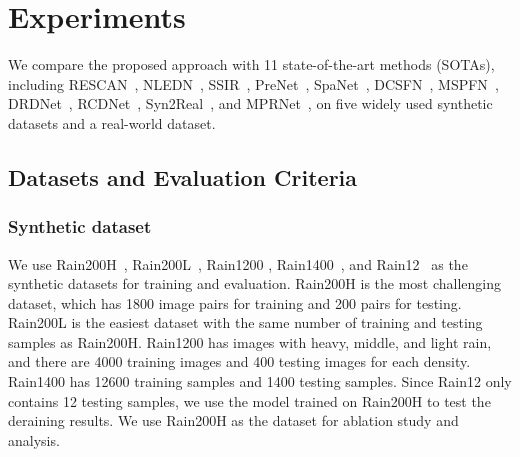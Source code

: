 \documentclass[letterpaper]{article} %
\begin{document}
%
\section{Experiments}
\label{sec: experiments}
%
We compare the proposed approach with 11 state-of-the-art methods (SOTAs), including
RESCAN~\cite{derain_rescan_li},
NLEDN~\cite{derain_nledn_li},
SSIR~\cite{Derain-cvpr19-semi},
PreNet~\cite{derain_prenet_Ren_2019_CVPR},
SpaNet~\cite{derain_2019_CVPR_spa},
DCSFN~\cite{mm20_wang_dcsfn},
MSPFN~\cite{cvpr20_jiang_mspfn},
DRDNet~\cite{drd_cvpr20_deng},
RCDNet~\cite{cvpr20_wang_rcdnet},
Syn2Real~\cite{cvpr20_syn2real}, and
MPRNet~\cite{derain_mprnet_cvpr21}, on five widely used synthetic datasets and a real-world dataset.
%
\subsection{Datasets and Evaluation Criteria}
%
%
\subsubsection{Synthetic dataset}
%
We use Rain200H~\cite{derain_jorder_yang}, Rain200L~\cite{derain_jorder_yang},
Rain1200 \cite{derain_zhang_did},
Rain1400~\cite{derain_ddn_fu}, and
Rain12~\cite{derain_lp_li} as the synthetic datasets for training and evaluation.
{Rain200H} is the most challenging dataset, which has 1800 image pairs for training and 200 pairs for testing.
{Rain200L} is the easiest dataset with the same number of training and testing samples as Rain200H.
{Rain1200} has images with heavy, middle, and light rain, and there are 4000 training images and 400 testing images for each density.
{Rain1400} has 12600 training samples and 1400 testing samples.
Since {Rain12} only contains 12 testing samples, we use the model trained on Rain200H to test the deraining results.
We use Rain200H as the dataset for ablation study and analysis.


%
\end{document}
